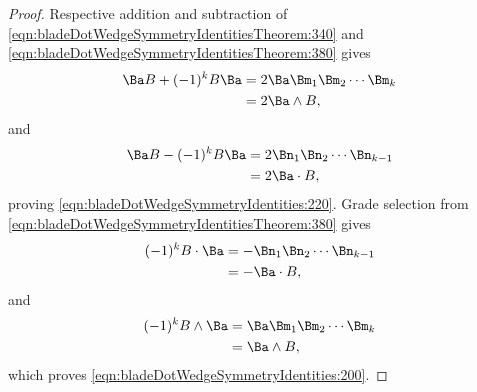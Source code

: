 \begin{proof}
Respective addition and subtraction of \cref{eqn:bladeDotWedgeSymmetryIdentitiesTheorem:340} and \cref{eqn:bladeDotWedgeSymmetryIdentitiesTheorem:380} gives
\begin{equation}\label{eqn:bladeDotWedgeSymmetryIdentitiesTheorem:400}
\begin{aligned}
\Ba B + (-1)^k B \Ba
&= 2 \Ba \Bm_1 \Bm_2 \cdots \Bm_k \\
&= 2 \Ba \wedge B,
\end{aligned}
\end{equation}
and
\begin{equation}\label{eqn:bladeDotWedgeSymmetryIdentitiesTheorem:420}
\begin{aligned}
\Ba B - (-1)^k B \Ba
&= 2 \Bn_1 \Bn_2 \cdots \Bn_{k-1} \\
&= 2 \Ba \cdot B,
\end{aligned}
\end{equation}
proving \cref{eqn:bladeDotWedgeSymmetryIdentities:220}.  Grade selection from \cref{eqn:bladeDotWedgeSymmetryIdentitiesTheorem:380} gives
\begin{equation}\label{eqn:bladeDotWedgeSymmetryIdentitiesTheorem:440}
\begin{aligned}
(-1)^k B \cdot \Ba
&= - \Bn_1 \Bn_2 \cdots \Bn_{k-1} \\
&= - \Ba \cdot B,
\end{aligned}
\end{equation}
and
\begin{equation}\label{eqn:bladeDotWedgeSymmetryIdentitiesTheorem:460}
\begin{aligned}
(-1)^k B \wedge \Ba
&= \Ba \Bm_1 \Bm_2 \cdots \Bm_k \\
&= \Ba \wedge B,
\end{aligned}
\end{equation}
which proves \cref{eqn:bladeDotWedgeSymmetryIdentities:200}.
\end{proof}
